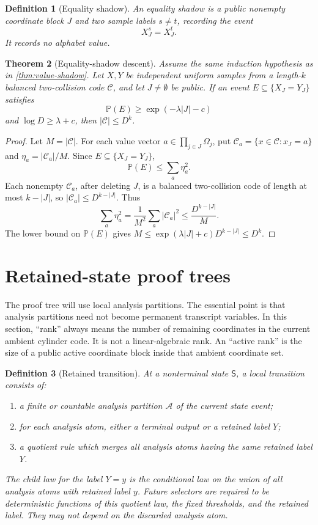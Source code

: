 \documentclass[11pt]{article}
\newcommand{\Cref}[1]{\ref{#1}}
\newtheorem{theorem}{Theorem}[section]
\newtheorem{definition}[theorem]{Definition}
\theoremstyle{remark}
\newcommand{\C}{\mathcal C}
\newcommand{\Prob}{\mathbb P}
\newcommand{\State}{\mathsf S}
\begin{document}
\begin{definition}[Equality shadow]
An equality shadow is a public nonempty coordinate block $J$ and two sample labels $s\ne t$, recording the event
\[
        X^s_J=X^t_J.
\]
It records no alphabet value.
\end{definition}

\begin{theorem}[Equality-shadow descent]\label{thm:equality-shadow}
Assume the same induction hypothesis as in \Cref{thm:value-shadow}.  Let $X,Y$ be independent uniform samples from a length-$k$ balanced two-collision code $\C$, and let $J\ne\emptyset$ be public.  If an event $E\subseteq\{X_J=Y_J\}$ satisfies
\[
        \Prob(E)\ge \exp(-\lambda |J|-c)
\]
and $\log D\ge \lambda+c$, then $|\C|\le D^k$.
\end{theorem}

\begin{proof}
Let $M=|\C|$.  For each value vector $a\in\prod_{j\in J}\Omega_j$, put $\C_a=\{x\in\C:x_J=a\}$ and $\eta_a=|\C_a|/M$.  Since $E\subseteq\{X_J=Y_J\}$,
\[
        \Prob(E)\le \sum_a \eta_a^2.
\]
Each nonempty $\C_a$, after deleting $J$, is a balanced two-collision code of length at most $k-|J|$, so $|\C_a|\le D^{k-|J|}$.  Thus
\[
        \sum_a\eta_a^2=\frac{1}{M^2}\sum_a|\C_a|^2
        \le \frac{D^{k-|J|}}{M}.
\]
The lower bound on $\Prob(E)$ gives $M\le \exp(\lambda |J|+c)D^{k-|J|}\le D^k$.
\end{proof}

\section{Retained-state proof trees}

The proof tree will use local analysis partitions.  The essential point is that analysis partitions need not become permanent transcript variables.
In this section, ``rank'' always means the number of remaining coordinates in
the current ambient cylinder code.  It is not a linear-algebraic rank.  An
``active rank'' is the size of a public active coordinate block inside that
ambient coordinate set.

\begin{definition}[Retained transition]
At a nonterminal state $\State$, a local transition consists of:
\begin{enumerate}[label=\textup{(\roman*)}]
\item a finite or countable analysis partition $\mathcal A$ of the current state event;
\item for each analysis atom, either a terminal output or a retained label $Y$;
\item a quotient rule which merges all analysis atoms having the same retained label $Y$.
\end{enumerate}
The child law for the label $Y=y$ is the conditional law on the union of all analysis atoms with retained label $y$.  Future selectors are required to be deterministic functions of this quotient law, the fixed thresholds, and the retained label.  They may not depend on the discarded analysis atom.
\end{definition}
\end{document}
